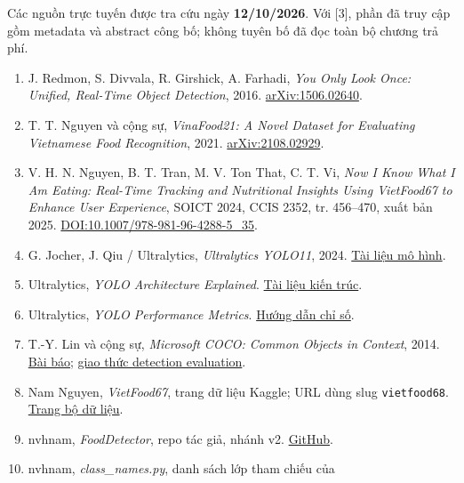 \documentclass[
  vietnamese,
  12pt,
  a4paper,
]{article}
\providecommand{\tightlist}{%
  \setlength{\itemsep}{0pt}\setlength{\parskip}{0pt}}
\begin{document}
Các nguồn trực tuyến được tra cứu ngày \textbf{12/10/2026}. Với {[}3{]},
phần đã truy cập gồm metadata và abstract công bố; không tuyên bố đã đọc
toàn bộ chương trả phí.

\begin{enumerate}
\def\labelenumi{\arabic{enumi}.}
\tightlist
\item
  J. Redmon, S. Divvala, R. Girshick, A. Farhadi, \emph{You Only Look
  Once: Unified, Real-Time Object Detection}, 2016.
  \href{https://arxiv.org/abs/1506.02640}{arXiv:1506.02640}.
\item
  T. T. Nguyen và cộng sự, \emph{VinaFood21: A Novel Dataset for
  Evaluating Vietnamese Food Recognition}, 2021.
  \href{https://arxiv.org/abs/2108.02929}{arXiv:2108.02929}.
\item
  V. H. N. Nguyen, B. T. Tran, M. V. Ton That, C. T. Vi, \emph{Now I
  Know What I Am Eating: Real-Time Tracking and Nutritional Insights
  Using VietFood67 to Enhance User Experience}, SOICT 2024, CCIS 2352,
  tr. 456--470, xuất bản 2025.
  \href{https://link.springer.com/chapter/10.1007/978-981-96-4288-5_35}{DOI:10.1007/978-981-96-4288-5\_35}.
\item
  G. Jocher, J. Qiu / Ultralytics, \emph{Ultralytics YOLO11}, 2024.
  \href{https://docs.ultralytics.com/models/yolo11/}{Tài liệu mô hình}.
\item
  Ultralytics, \emph{YOLO Architecture Explained}.
  \href{https://docs.ultralytics.com/guides/yolo-architecture/}{Tài liệu
  kiến trúc}.
\item
  Ultralytics, \emph{YOLO Performance Metrics}.
  \href{https://docs.ultralytics.com/guides/yolo-performance-metrics/}{Hướng
  dẫn chỉ số}.
\item
  T.-Y. Lin và cộng sự, \emph{Microsoft COCO: Common Objects in
  Context}, 2014. \href{https://arxiv.org/abs/1405.0312}{Bài báo};
  \href{https://cocodataset.org/\#detection-eval}{giao thức detection
  evaluation}.
\item
  Nam Nguyen, \emph{VietFood67}, trang dữ liệu Kaggle; URL dùng slug
  \texttt{v\allowbreak{}i\allowbreak{}e\allowbreak{}t\allowbreak{}f\allowbreak{}o\allowbreak{}o\allowbreak{}d\allowbreak{}6\allowbreak{}8\allowbreak{}}.
  \href{https://www.kaggle.com/datasets/thomasnguyen6868/vietfood68}{Trang
  bộ dữ liệu}.
\item
  nvhnam, \emph{FoodDetector}, repo tác giả, nhánh v2.
  \href{https://github.com/nvhnam/FoodDetector}{GitHub}.
\item
  nvhnam, \emph{class\_names.py}, danh sách lớp tham chiếu của

\end{enumerate}
\end{document}
